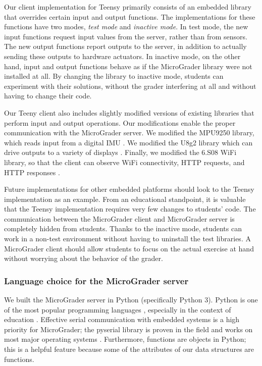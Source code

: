 \documentclass[12pt]{article}
\begin{document}
Our client implementation for Teensy primarily consists of an embedded library that overrides certain input and output functions.  The implementations for these functions have two modes, \textit{test mode} and \textit{inactive mode}.  In test mode, the new input functions request input values from the server, rather than from sensors.  The new output functions report outputs to the server, in addition to actually sending these outputs to hardware actuators.  In inactive mode, on the other hand, input and output functions behave as if the MicroGrader library were not installed at all.  By changing the library to inactive mode, students can experiment with their solutions, without the grader interfering at all and without having to change their code. 

Our Teeny client also includes slightly modified versions of existing libraries that perform input and output operations.  Our modifications enable the proper communication with the MicroGrader server.  We modified the MPU9250 library, which reads input from a digital IMU \cite{MPU9250}.  We modified the U8g2 library which can drive outputs to a variety of displays \cite{u8g2}.  Finally, we modified the 6.S08 WiFi library, so that the client can observe WiFi connectivity, HTTP requests, and HTTP responses \cite{6s08-wifi}.

Future implementations for other embedded platforms should look to the Teensy implementation as an example.  From an educational standpoint, it is valuable that the Teensy implementation requires very few changes to students' code.  The communication between the MicroGrader client and MicroGrader server is completely hidden from students.  Thanks to the inactive mode, students can work in a non-test environment without having to uninstall the test libraries.  A MicroGrader client should allow students to focus on the actual exercise at hand without worrying about the behavior of the grader.

\subsubsection{Language choice for the MicroGrader server}
We built the MicroGrader server in Python (specifically Python 3).  Python is one of the most popular programming languages \cite{python-popular}, especially in the context of education \cite{python-ed}.  Effective serial communication with embedded systems is a high priority for MicroGrader; the pyserial library is proven in the field and works on most major operating systems \cite{pyserial}. Furthermore, functions are objects in Python; this is a helpful feature because some of the attributes of our data structures are functions.  
\end{document}
